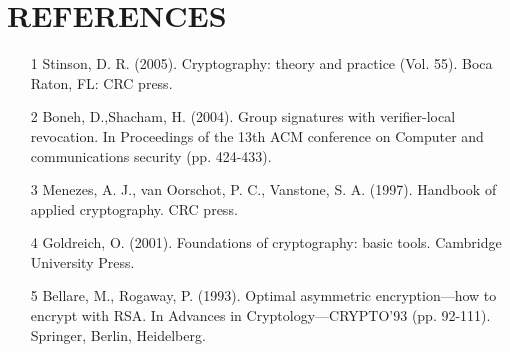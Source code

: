 \documentclass[a4paper,11pt]{report}
\begin{document}
\chapter{REFERENCES}

\begin{itemize}
\item[1] Stinson, D. R. (2005). Cryptography: theory and practice (Vol. 55). Boca Raton, FL: CRC press.
\item[2] Boneh, D.,Shacham, H. (2004). Group signatures with verifier-local revocation. In Proceedings of the 13th ACM conference on Computer and communications security (pp. 424-433).
\item[3] Menezes, A. J., van Oorschot, P. C.,  Vanstone, S. A. (1997). Handbook of applied cryptography. CRC press.
\item[4] Goldreich, O. (2001). Foundations of cryptography: basic tools. Cambridge University Press.
\item[5] Bellare, M., Rogaway, P. (1993). Optimal asymmetric encryption—how to encrypt with RSA. In Advances in Cryptology—CRYPTO'93 (pp. 92-111). Springer, Berlin, Heidelberg.

\vspace{12pt}
\end{itemize}
\end{document}
